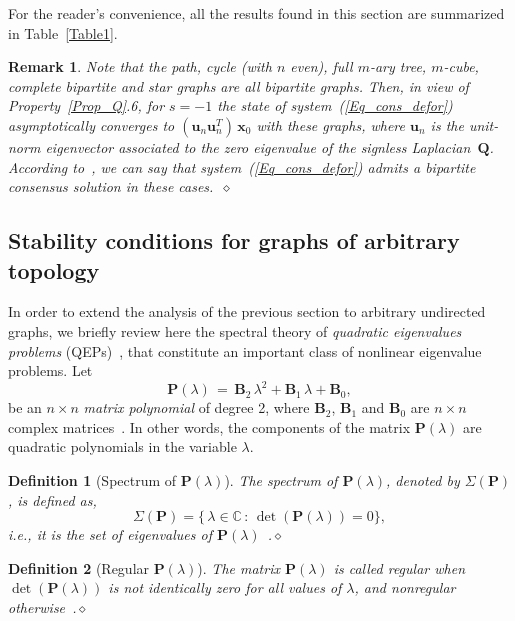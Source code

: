 \documentclass[letterpaper,9pt,twocolumn]{autart}
\newcommand{\vet}[1]{\ensuremath{{\mathbf #1}}}
\newtheorem{definition}{\textbf{Definition}}
\newtheorem{remark}{\textbf{Remark}}
\begin{document}
For the reader's convenience, all the results found in this section are summarized in Table~\ref{Table1}.

\begin{remark}\label{Remark_bipart}
Note that the path, cycle (with $n$ even), full $m$-ary tree, $m$-cube, complete
bipartite and star graphs are all \emph{bipartite} graphs. Then, in
view of Property~\ref{Prop_Q}.6, for $s = -1$ the state of system~(\ref{Eq_cons_defor})
asymptotically converges to $(\vet{u}_n\vet{u}_n^T)\,\vet{x}_0$ with these graphs, where $\vet{u}_n$
is the unit-norm eigenvector associated to the zero eigenvalue of the signless
Laplacian~$\vet{Q}$. According to~\cite[Def.~1]{Altafini_TAC13}, we can say that system~(\ref{Eq_cons_defor}) admits a \emph{bipartite
consensus solution} in these cases.~\hfill$\diamond$ \end{remark}



\subsection{Stability conditions for graphs of arbitrary topology}\label{Sect:Gen}

In order to extend the analysis of the previous section to arbitrary undirected graphs, we briefly review here the spectral theory of \emph{quadratic eigenvalues problems}
(QEPs)~\cite[Sect.~3]{TisseurMe_SIAM01},
that constitute an important class of nonlinear eigenvalue problems. Let
$$
\vet{P}(\lambda) \,=\, \vet{B}_2\,\lambda^2 + \vet{B}_1\,\lambda + \vet{B}_0,
$$
be an $n \times n$ \emph{matrix polynomial} of degree 2,
where $\vet{B}_2$, $\vet{B}_1$ and $\vet{B}_0$ are $n \times n$ complex matrices~\cite{GohbergLaRo_Book09}.
In other words, the components of the matrix $\vet{P}(\lambda)$ are
quadratic polynomials in the variable $\lambda$.


\begin{definition}[Spectrum of $\vet{P}(\lambda)$]
The \emph{spectrum} of $\vet{P}(\lambda)$, denoted by $\Sigma(\vet{P})$, is defined as,
$$
\Sigma(\vet{P}) = \{\,\lambda \in \mathbb{C}\,:\, \det(\vet{P}(\lambda)) = 0\},
$$
i.e., it is the set of eigenvalues of $\vet{P}(\lambda)$~\cite{TisseurMe_SIAM01}.\hfill$\diamond$
\end{definition}

\begin{definition}[Regular $\vet{P}(\lambda)$]\label{Def_regular}
The matrix $\vet{P}(\lambda)$ is called \emph{regular} when $\det(\vet{P}(\lambda))$ is not identically zero
for all values of $\lambda$, and \emph{nonregular} otherwise~\cite{TisseurMe_SIAM01}.\hfill$\diamond$
\end{definition}
\end{document}

